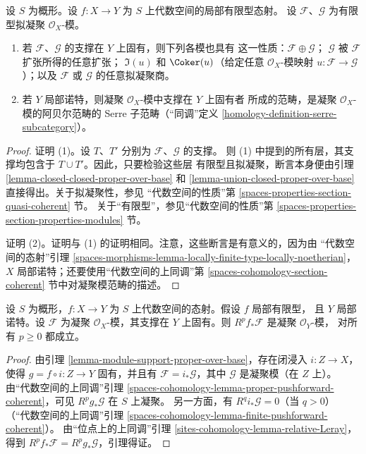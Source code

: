 \begin{lemma}
\label{lemma-cat-module-support-proper-over-base}
设 $S$ 为概形。设 $f : X \to Y$ 为 $S$ 上代数空间的局部有限型态射。
设 $\mathcal{F}$、$\mathcal{G}$ 为有限型拟凝聚 $\mathcal{O}_X$-模。
\begin{enumerate}
\item 若 $\mathcal{F}$、$\mathcal{G}$ 的支撑在 $Y$ 上固有，则下列各模也具有
这一性质：$\mathcal{F} \oplus \mathcal{G}$；
$\mathcal{G}$ 被 $\mathcal{F}$ 扩张所得的任意扩张；
$\Im(u)$ 和 $\Coker(u)$（给定任意 $\mathcal{O}_X$-模映射
$u : \mathcal{F} \to \mathcal{G}$）；以及 $\mathcal{F}$ 或
$\mathcal{G}$ 的任意拟凝聚商。
\item 若 $Y$ 局部诺特，则凝聚 $\mathcal{O}_X$-模中支撑在 $Y$ 上固有者
所成的范畴，是凝聚 $\mathcal{O}_X$-模的阿贝尔范畴的
Serre 子范畴（“同调”定义
\ref{homology-definition-serre-subcategory}）。
\end{enumerate}
\end{lemma}

\begin{proof}
证明 (1)。设 $T$、$T'$ 分别为 $\mathcal{F}$、$\mathcal{G}$ 的支撑。
则 (1) 中提到的所有层，其支撑均包含于 $T \cup T'$。因此，只要检验这些层
有限型且拟凝聚，断言本身便由引理
\ref{lemma-closed-closed-proper-over-base} 和
\ref{lemma-union-closed-proper-over-base} 直接得出。关于拟凝聚性，参见
“代数空间的性质”第 \ref{spaces-properties-section-quasi-coherent} 节。
关于“有限型”，参见“代数空间的性质”第
\ref{spaces-properties-section-properties-modules} 节。

\medskip\noindent
证明 (2)。证明与 (1) 的证明相同。注意，这些断言是有意义的，因为由
“代数空间的态射”引理
\ref{spaces-morphisms-lemma-locally-finite-type-locally-noetherian}，
$X$ 局部诺特；还要使用“代数空间的上同调”第
\ref{spaces-cohomology-section-coherent} 节中对凝聚模范畴的描述。
\end{proof}

\begin{lemma}
\label{lemma-support-proper-over-base-pushforward}
设 $S$ 为概形，$f : X \to Y$ 为 $S$ 上代数空间的态射。假设 $f$ 局部有限型，
且 $Y$ 局部诺特。设 $\mathcal{F}$ 为凝聚 $\mathcal{O}_X$-模，其支撑在
$Y$ 上固有。则 $R^pf_*\mathcal{F}$ 是凝聚 $\mathcal{O}_Y$-模，
对所有 $p \geq 0$ 都成立。
\end{lemma}

\begin{proof}
由引理 \ref{lemma-module-support-proper-over-base}，存在闭浸入
$i : Z \to X$，使得 $g = f \circ i : Z \to Y$ 固有，并且有
$\mathcal{F} = i_*\mathcal{G}$，其中 $\mathcal{G}$ 是凝聚模（在 $Z$ 上）。
由“代数空间的上同调”引理
\ref{spaces-cohomology-lemma-proper-pushforward-coherent}，可见
$R^pg_*\mathcal{G}$ 在 $S$ 上凝聚。 %
另一方面，有 $R^qi_*\mathcal{G} = 0$（当 $q > 0$）
（“代数空间的上同调”引理
\ref{spaces-cohomology-lemma-finite-pushforward-coherent}）。
由“位点上的上同调”引理
\ref{sites-cohomology-lemma-relative-Leray}，得到
$R^pf_*\mathcal{F} = R^pg_*\mathcal{G}$，引理得证。
\end{proof}

